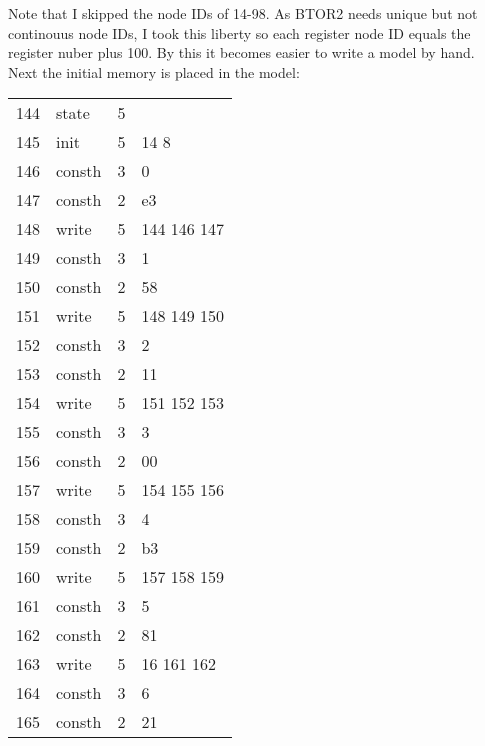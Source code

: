Note that I skipped the node IDs of 14-98. As BTOR2 needs unique but
not continouus node IDs, I took this liberty so each register node ID
equals the register nuber plus 100. By this it becomes easier to
write a model by hand.\\ Next the initial memory is placed in the
model:
\begin{center}
    \begin{tabular}[h!]{>{\ttfamily\color{UniRed}}r >{\ttfamily}l >{\ttfamily\color{UniGrey}}l >{\ttfamily\color{UniBlue}}l}
        144 & state  & 5 &                           \\
        145 & init   & 5 & \color{UniRed} 14 8       \\
        146 & consth & 3 & 0                         \\
        147 & consth & 2 & e3                        \\
        148 & write  & 5 & \color{UniRed}144 146 147 \\
        149 & consth & 3 & 1                         \\
        150 & consth & 2 & 58                        \\
        151 & write  & 5 & \color{UniRed}148 149 150 \\
        152 & consth & 3 & 2                         \\
        153 & consth & 2 & 11                        \\
        154 & write  & 5 & \color{UniRed}151 152 153 \\
        155 & consth & 3 & 3                         \\
        156 & consth & 2 & 00                        \\
        157 & write  & 5 & \color{UniRed}154 155 156 \\
        158 & consth & 3 & 4                         \\
        159 & consth & 2 & b3                        \\
        160 & write  & 5 & \color{UniRed}157 158 159 \\
        161 & consth & 3 & 5                         \\
        162 & consth & 2 & 81                        \\
        163 & write  & 5 & \color{UniRed} 16 161 162 \\
        164 & consth & 3 & 6                         \\
        165 & consth & 2 & 21                        \\

\end{tabular}
\end{center}

